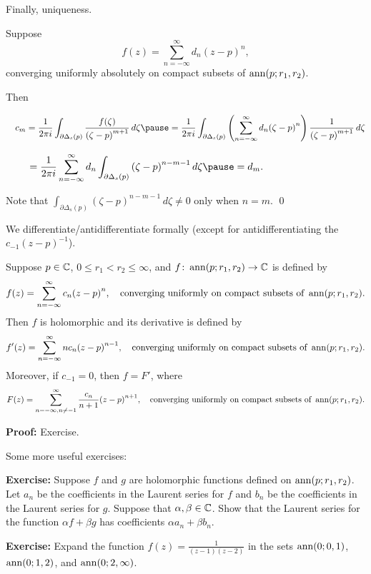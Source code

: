 \documentclass[10pt,aspectratio=169]{beamer}
\begin{document}
\begin{frame}
Finally, uniqueness.

\medskip
\pause
Suppose
\[
f(z)
=
\sum_{n=-\infty}^{\infty} d_n {(z-p)}^{n} ,
\]
converging uniformly absolutely on compact subsets of $\operatorname{ann}(p;r_1,r_2)$.

\medskip
\pause

Then

\medskip
\pause

$\displaystyle
\quad
c_m
= \frac{1}{2\pi i}
\int_{\partial \Delta_{s}(p)} \frac{f(\zeta)}{{(\zeta-p)}^{m+1}}
 \, d\zeta 
\pause
=
\frac{1}{2\pi i}
\int_{\partial \Delta_{s}(p)}
\left(\sum_{n=-\infty}^{\infty} d_n {(\zeta-p)}^{n} \right)
\frac{1}{{(\zeta-p)}^{m+1}}
 \, d\zeta 
$
\medskip
\pause

$\displaystyle
\quad \quad \,\,
=
\frac{1}{2\pi i}
\sum_{n=-\infty}^{\infty}
d_n
\int_{\partial \Delta_{s}(p)}
{(\zeta-p)}^{n-m-1}
 \, d\zeta 
\pause
=
d_m .
$

\medskip
\pause

Note that
$\int_{\partial \Delta_{s}(p)}
{(\zeta-p)}^{n-m-1}
 \, d\zeta \not= 0$ only when $n=m$.
\qed
\end{frame}

\begin{frame}
We differentiate/antidifferentiate formally
(except for antidifferentiating the $c_{-1}{(z-p)}^{-1}$).

\pause

\begin{proposition}
Suppose $p \in {\mathbb{C}}$, $0 \leq r_1 < r_2 \leq \infty$, and
$f \colon \operatorname{ann}(p;r_1,r_2) \to {\mathbb{C}}$ is defined by
\[
f(z) = \sum_{n=-\infty}^\infty c_n {(z-p)}^n ,
\quad
\text{converging uniformly on compact subsets of } \operatorname{ann}(p;r_1,r_2).
\]
\pause
Then $f$ is holomorphic and its 
derivative is defined by
\[
f'(z) = \sum_{n=-\infty}^\infty n c_n {(z-p)}^{n-1} ,
\quad
\text{converging uniformly on compact subsets of } \operatorname{ann}(p;r_1,r_2).
\]
\pause
Moreover, if $c_{-1} = 0$, then $f = F'$, where
\[
F(z) = \sum_{n=-\infty,n\not=-1}^\infty \frac{c_n}{n+1} {(z-p)}^{n+1},
\quad
\text{converging uniformly on compact subsets of } \operatorname{ann}(p;r_1,r_2).
\]
\end{proposition}

\pause

\textbf{Proof:} Exercise.
\end{frame}

\begin{frame}
Some more useful exercises:

\medskip
\pause

\textbf{Exercise:}
Suppose $f$ and $g$ are holomorphic functions defined on
$\operatorname{ann}(p;r_1,r_2)$.  Let $a_n$ be the coefficients in the Laurent series for
$f$ and $b_n$ be the coefficients in the Laurent series for $g$.  Suppose
that $\alpha,\beta \in {\mathbb{C}}$.  Show that the Laurent series for the function
$\alpha f + \beta g$ has coefficients $\alpha a_n + \beta b_n$.

\medskip
\pause

\textbf{Exercise:}
Expand the function $f(z) = \frac{1}{(z-1)(z-2)}$ in the
sets
$\operatorname{ann}(0;0,1)$, $\operatorname{ann}(0;1,2)$, and $\operatorname{ann}(0;2,\infty)$.


\end{frame}
\end{document}
